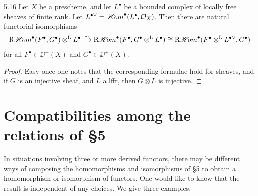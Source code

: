 \begin{bookproposition}{5.16}\label{prop:2.5.16}
Let $X$ be a prescheme, and let $L^\bullet$ be a bounded complex of locally free sheaves of finite rank. Let $L^{\bullet\vee}=\mathop{\mathscr{H}\!om}\nolimits^\bullet(L^\bullet,\mathcal{O}_X)$. Then there are natural functorial isomorphisms
\[
\mathop{\mathrm{R}\mathscr{H}\!om}\nolimits^\bullet(F^\bullet,G^\bullet)\mathbin{\otimes^{\mathrm{L}}} L^\bullet \xrightarrow{\sim} \mathop{\mathrm{R}\mathscr{H}\!om}\nolimits^\bullet(F^\bullet,G^\bullet\mathbin{\otimes^{\mathrm{L}}} L^\bullet) \cong \mathop{\mathrm{R}\mathscr{H}\!om}\nolimits^\bullet(F^\bullet\mathbin{\otimes^{\mathrm{L}}} L^{\bullet\vee},G^\bullet)
\]
for all $F^\bullet\in\DD^-(X)$ and $G^\bullet\in\DD^+(X)$.
\end{bookproposition}

\begin{proof}
Easy once one notes that the corresponding formulae hold for sheaves, and if $G$ is an injective sheaf, and $L$ a lffr, then $G\otimes L$ is injective.
\end{proof}

\section{Compatibilities among the relations of \S5}\label{sec:2.6}

In situations involving three or more derived functors, there may be different ways of composing the homomorphisms and isomorphisms of \S5 to obtain a homomorphism or isomorphism of functors. One would like to know that the result is independent of any choices. We give three examples.


